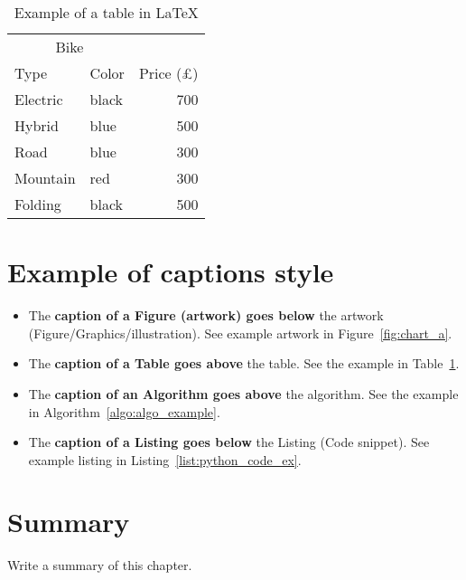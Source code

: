 \begin{table}[h!]
    \centering
    \caption{Example of a table in \LaTeX}
    \label{tab:_ex_tab}
    \begin{tabular}{llr}     
        \toprule
        \multicolumn{2}{c}{Bike} \\
        \cmidrule(r){1-2}
        Type    &  Color & Price (\pounds) \\
        \midrule
        Electric    & black   & 700   \\
        Hybrid      & blue    & 500   \\
        Road        & blue    & 300   \\
        Mountain    & red     & 300   \\
        Folding     & black   & 500   \\
        \bottomrule
    \end{tabular}
\end{table}

\section{Example of captions style}

\begin{itemize}
    \item The \textbf{caption of a Figure (artwork) goes below} the artwork (Figure/Graphics/illustration). See example artwork in Figure~\ref{fig:chart_a}. 
    \item  The \textbf{caption of a Table goes above} the table. See the example in Table~\ref{tab:_ex_tab}.
    \item  The \textbf{caption of an Algorithm goes above} the algorithm. See the example in Algorithm~\ref{algo:algo_example}.
    \item The \textbf{caption of a Listing goes below} the Listing  (Code snippet). See example listing in Listing~\ref{list:python_code_ex}. 
\end{itemize} 





\section{Summary}
Write a summary of this chapter.



